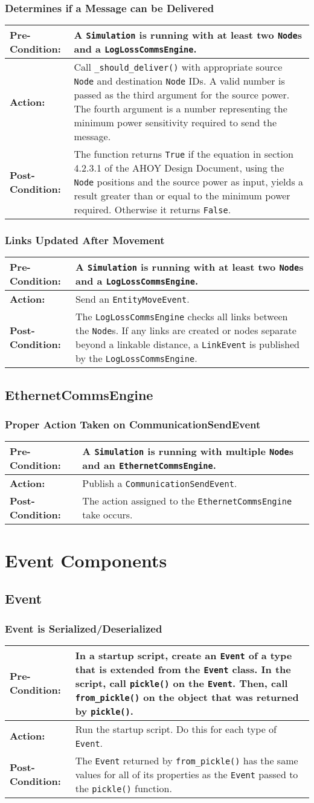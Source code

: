 \documentclass[titlepage]{article}
\newcommand{\testcase}[3]{
    \begin{center}
    \begin{tabular}{| l | p{0.7\textwidth}|}
        \hline
        \rowcolor[gray]{0.8}\textbf{Pre-Condition:} & #1 \\ \hline
        \textbf{Action:} & #2 \\ \hline
        \rowcolor[gray]{0.8}\textbf{Post-Condition:} & #3 \\ \hline
    \end{tabular}
    \end{center}
}
\begin{document}
\subsubsection{Determines if a Message can be Delivered}
\testcase{A \texttt{Simulation} is running with at least two \texttt{Node}s and a \texttt{LogLossCommsEngine}.}{Call \texttt{\_should\_deliver()} with appropriate source \texttt{Node} and destination \texttt{Node} IDs. A valid number is passed as the third argument for the source power. The fourth argument is a number representing the minimum power sensitivity required to send the message.}{The function returns \texttt{True} if the equation in section 4.2.3.1 of the AHOY Design Document, using the \texttt{Node} positions and the source power as input, yields a result greater than or equal to the minimum power required. Otherwise it returns \texttt{False}.}

\subsubsection{Links Updated After Movement}
\testcase{A \texttt{Simulation} is running with at least two \texttt{Node}s and a \texttt{LogLossCommsEngine}.}{Send an \texttt{EntityMoveEvent}.}{The \texttt{LogLossCommsEngine} checks all links between the \texttt{Node}s. If any links are created or nodes separate beyond a linkable distance, a \texttt{LinkEvent} is published by the \texttt{LogLossCommsEngine}.}

\subsection{EthernetCommsEngine}
\subsubsection{Proper Action Taken on CommunicationSendEvent}
\testcase{A \texttt{Simulation} is running with multiple \texttt{Node}s and an \texttt{EthernetCommsEngine}.}{Publish a \texttt{CommunicationSendEvent}.}{The action assigned to the \texttt{EthernetCommsEngine} take occurs.}

\section{Event Components}
\subsection{Event}
\subsubsection{Event is Serialized/Deserialized}
\testcase{In a startup script, create an \texttt{Event} of a type that is extended from the \texttt{Event} class. In the script, call \texttt{pickle()} on the \texttt{Event}. Then, call \texttt{from\_pickle()} on the object that was returned by \texttt{pickle()}.}{Run the startup script. Do this for each type of \texttt{Event}.}{The \texttt{Event} returned by \texttt{from\_pickle()} has the same values for all of its properties as the \texttt{Event} passed to the \texttt{pickle()} function.}
\end{document}
